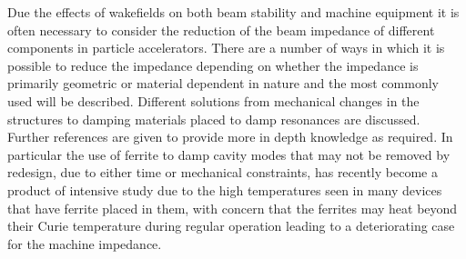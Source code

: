 Due the effects of wakefields on both beam stability and machine equipment it is often necessary to consider the reduction of the beam impedance of different components in particle accelerators. There are a number of ways in which it is possible to reduce the impedance depending on whether the impedance is primarily geometric or material dependent in nature and the most commonly used will be described. Different solutions from mechanical changes in the structures to damping materials placed to damp resonances are discussed. Further references are given to provide more in depth knowledge as required. In particular the use of ferrite to damp cavity modes that may not be removed by redesign, due to either time or mechanical constraints, has recently become a product of intensive study due to the high temperatures seen in many devices that have ferrite placed in them, with concern that the ferrites may heat beyond their Curie temperature during regular operation leading to a deteriorating case for the machine impedance. 
